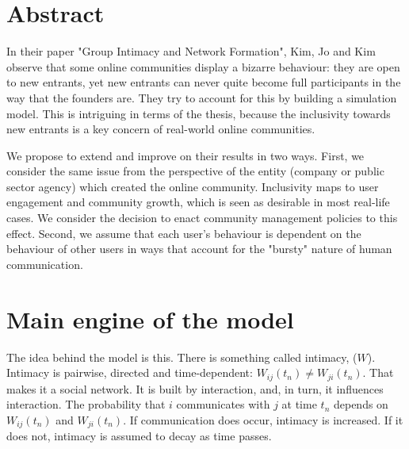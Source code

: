 \documentclass{article}
\begin{document}
\maketitle

\section{Abstract}

In their paper "Group Intimacy and Network Formation", Kim, Jo and Kim observe that some online communities display a bizarre behaviour: they are open to new entrants, yet new entrants can never quite become full participants in the way that the founders are. They try to account for this by building a simulation model. This is intriguing in terms of the thesis, because the inclusivity towards new entrants is a key concern of real-world online communities. 

We propose to extend and improve on their results in two ways. First, we consider the same issue from the perspective of the entity (company or public sector agency) which created the online community. Inclusivity maps to user engagement and community growth, which is seen as desirable in most real-life cases. We consider the decision to enact community management policies to this effect. Second, we assume that each user's behaviour is dependent on the behaviour of other users in ways that account for the "bursty" nature of human communication.

\section{Main engine of the model} \label{sec:mainEngine}

The idea behind the model is this. There is something called intimacy, ($W$). Intimacy is pairwise, directed and time-dependent: $W_{ij}(t_n) \neq W_{ji}(t_n)$. That makes it a social network. It is built by interaction, and, in turn, it influences interaction. The probability that $i$ communicates with $j$ at time $t_n$ depends on $W_{ij}(t_n)$ and $W_{ji}(t_n)$. If communication does occur, intimacy is increased. If it does not, intimacy is assumed to decay as time passes.
\end{document}
